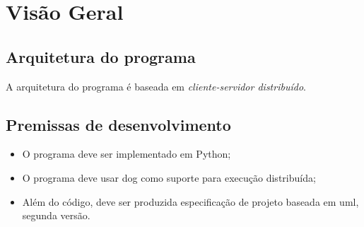 \chapter{Visão Geral}

\section{Arquitetura do programa}
A arquitetura do programa é baseada em \textit{cliente-servidor distribuído}.

\section{Premissas de desenvolvimento}

\begin{itemize}
  \item O programa deve ser implementado em Python; 
  \item O programa deve usar \gls{dog} como suporte para execução distribuída; 
  \item Além do código, deve ser produzida especificação de projeto baseada em \gls{uml}, segunda versão.
\end{itemize}
